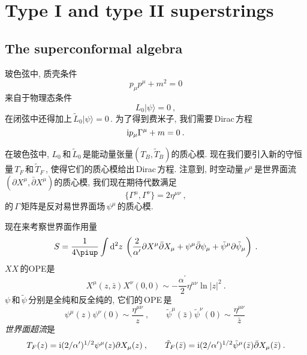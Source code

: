 
\chapter{ Type I and type II superstrings  }


\section{ The superconformal algebra }

玻色弦中, 质壳条件
\begin{equation}
    p_{\mu}p^{\mu}+m^{2}=0 \label{10.1.1}
\end{equation}
来自于物理态条件
\begin{equation}
    L_{0}\lvert \psi\rangle = 0\: , \label{10.1.2}
\end{equation}
在闭弦中还得加上$\,\tilde{L}_{0}\lvert\psi\rangle=0\,$. 为了得到费米子, 我们需要\,Dirac\,方程
\begin{equation}
    \mathrm{i} p_{\mu} \Gamma^{\mu}+m=0\:. \label{10.1.3}
\end{equation}

在玻色弦中, $L_{0}\,$和$\,\tilde{L}_{0}\,$是能动量张量$(T_{B},\tilde{T}_{B})$的质心模. 现在我们要引入新的守恒量$\,T_{F}\,$和$\,\tilde{T}_{F}\,$, 使得它们的质心模给出\,Dirac\,方程. 注意到, 时空动量$\,p^{\mu}\,$是世界面流$(\partial X^{\mu},\bar{\partial}X^{\mu} )$的质心模, 我们现在期待代数满足
\begin{equation}
    \{\Gamma^{\mu},\Gamma^{\nu}\}=2\eta^{\mu\nu} \:, \label{10.1.4}
\end{equation}
的\,$\Gamma$\,矩阵是反对易世界面场$\,\psi^{\mu}\,$的质心模.

现在来考察世界面作用量
\begin{equation}
    S=\frac{1}{4\uppi}\int\dif^{2}z \:
    \left(
    \frac{2}{\alpha^{\prime}}\partial X^{\mu}\bar{\partial}X_{\mu} +\psi^{\mu}\bar{\partial}\psi_{\mu}
    +\tilde{\psi}^{\mu}\partial\tilde{\psi}_{\mu}
    \right)\:.\label{10.1.5}
\end{equation}
$XX\,$的OPE是
\begin{equation}
    X^{\mu}(z,\bar{z})X^{\nu}(0,0)\sim -\frac{\alpha^{\prime}}{2}\eta^{\mu\nu}\ln\lvert z\rvert^{2}\:.\label{10.1.6}
\end{equation}
$\psi\,$和$\,\tilde{\psi}\,$分别是全纯和反全纯的, 它们的\,OPE\,是
\begin{equation}
    \psi^{\mu}(z)\psi^{\nu}(0)\sim\frac{\eta^{\mu\nu}}{z}\:,\qquad
     \tilde{\psi}^{\mu}(\bar{z})\tilde{\psi}^{\nu}(0)\sim\frac{\eta^{\mu\nu}}{\bar{z}}\: \label{10.1.7}
\end{equation}
{\emph{世界面超流}}是
\begin{equation}
    T_{F}(z)=\mathrm{i}(2/\alpha^{\prime})^{1/2}\psi^{\mu}(z)\partial X_{\mu}(z)\:,\qquad
     \tilde{T}_{F}(\bar{z})=\mathrm{i}(2/\alpha^{\prime})^{1/2}\tilde{\psi}^{\mu}(\bar{z})\bar{\partial} X_{\mu}(\bar{z})
     \:.\label{10.1.8}
\end{equation}

